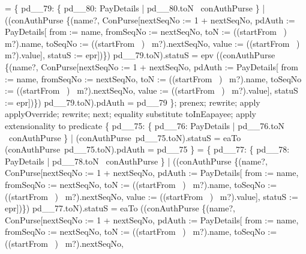 \begin{LPScript}
\begin{zproof}[lPromotedAuxWorldStartFromType]
            = \{ pd\_\_79: \{ pd\_\_80: PayDetails | pd\_\_80.toN \in \dom~conAuthPurse \}
              | ((conAuthPurse \oplus \{(name?, \theta ConPurse[nextSeqNo := 1 + nextSeqNo,
                pdAuth := \theta PayDetails[
                    from := name, fromSeqNo := nextSeqNo,
                    toN := ((startFrom~ \inv)~ m?).name,
                    toSeqNo := ((startFrom~ \inv)~ m?).nextSeqNo,
                    value := ((startFrom~ \inv)~ m?).value],
                statuS := epr])\}) pd\_\_79.toN).statuS = epv
              \land ((conAuthPurse \oplus \{(name?, \theta ConPurse[nextSeqNo := 1 + nextSeqNo,
                pdAuth := \theta PayDetails[
                    from := name, fromSeqNo := nextSeqNo,
                    toN := ((startFrom~ \inv)~ m?).name,
                    toSeqNo := ((startFrom~ \inv)~ m?).nextSeqNo,
                    value := ((startFrom~ \inv)~ m?).value],
                statuS := epr])\}) pd\_\_79.toN).pdAuth = pd\_\_79 \};
        prenex;
        rewrite;
        apply applyOverride;
        rewrite;
    next;
        equality substitute toInEapayee;
        apply extensionality to predicate
            \{ pd\_\_75: \{ pd\_\_76: PayDetails | pd\_\_76.toN \in \dom~conAuthPurse \}
              | (conAuthPurse~pd\_\_75.toN).statuS = eaTo
              \land (conAuthPurse~pd\_\_75.toN).pdAuth = pd\_\_75 \}
            = \{ pd\_\_77: \{ pd\_\_78: PayDetails | pd\_\_78.toN \in \dom~conAuthPurse \}
                | ((conAuthPurse \oplus \{(name?, \theta ConPurse[nextSeqNo := 1 + nextSeqNo,
                pdAuth := \theta PayDetails[
                    from := name, fromSeqNo := nextSeqNo,
                    toN := ((startFrom~ \inv)~ m?).name,
                    toSeqNo := ((startFrom~ \inv)~ m?).nextSeqNo,
                    value := ((startFrom~ \inv)~ m?).value],
                statuS := epr])\}) pd\_\_77.toN).statuS
                = eaTo
                \land ((conAuthPurse \oplus \{(name?, \theta ConPurse[nextSeqNo := 1 + nextSeqNo,
                    pdAuth := \theta PayDetails[
                        from := name, fromSeqNo := nextSeqNo,
                        toN := ((startFrom~ \inv)~ m?).name,
                        toSeqNo := ((startFrom~ \inv)~ m?).nextSeqNo,

\end{zproof}
\end{LPScript}
